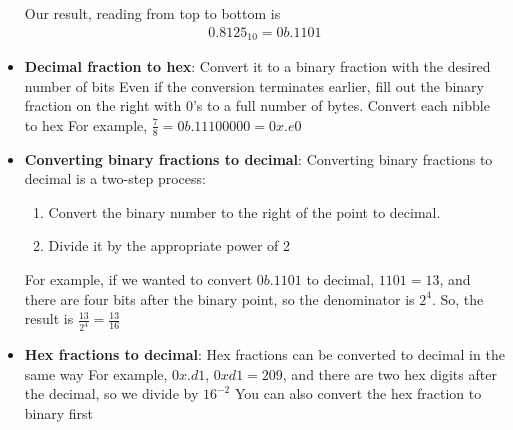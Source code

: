 \documentclass{report}
\begin{document}
\begin{itemize}
            Our result, reading from top to bottom is
            \begin{align*}
                0.8125_{10} = 0b.1101
            \end{align*}
        \item \textbf{Decimal fraction to hex}: Convert it to a binary fraction with the desired number of bits
            \bigbreak \noindent 
            Even if the conversion terminates earlier, fill out the binary fraction on the right with 0’s to a full number of bytes.
            \bigbreak \noindent 
            Convert each nibble to hex
            \bigbreak \noindent 
            For example, $\frac{7}{8} = 0b.11100000  = 0x.e0$
        \item \textbf{Converting binary fractions to decimal}:
            Converting binary fractions to decimal is a two-step process:
            \begin{enumerate}
                \item Convert the binary number to the right of the point to decimal.
                \item Divide it by the appropriate power of 2
            \end{enumerate}
            For example, if we wanted to convert $0b.1101$ to decimal, $1101 = 13$, and there are four bits after the binary point, so the denominator is $2^{4}$. So, the result is $\frac{13}{2^{4}} =\frac{13}{16}$
        \item \textbf{Hex fractions to decimal}: Hex fractions can be converted to decimal in the same way
            \bigbreak \noindent 
            For example, $0x.d1$, $0xd1 = 209$, and there are two hex digits after the decimal, so we divide by $16^{-2} $
            \bigbreak \noindent 
            You can also convert the hex fraction to binary first
        
    \end{itemize}

    \pagebreak 
\end{document}
